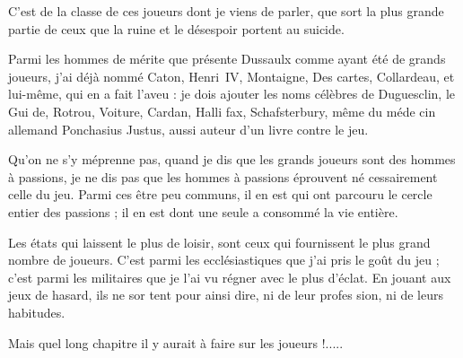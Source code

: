C'est de la classe de ces joueurs dont
je viens de parler, que sort la plus
grande partie de ceux que la ruine et
le désespoir portent au suicide.

Parmi les hommes de mérite que
présente Dussaulx comme ayant été
de grands joueurs, j'ai déjà nommé
Caton, Henri~IV, Montaigne, Des%
cartes, Collardeau, et lui-même, qui
en a fait l'aveu : je dois ajouter les
noms célèbres de Duguesclin, le Gui%
de, Rotrou, Voiture, Cardan, Halli%
fax, Schafsterbury, même du méde%
cin allemand Ponchasius Justus, aussi
auteur d'un livre contre le jeu.

Qu'on ne s'y méprenne pas, quand
je dis que les grands joueurs sont des
hommes à passions, je ne dis pas que
les hommes à passions éprouvent né%
cessairement celle du jeu. Parmi ces
être peu communs, il en est qui ont
parcouru le cercle entier des passions ;
il en est dont une seule a consommé
la vie entière.

Les états qui laissent le plus de loisir,
sont ceux qui fournissent le plus grand
nombre de joueurs. C'est parmi les
ecclésiastiques que j'ai pris le goût du
jeu ; c'est parmi les militaires que je
l'ai vu régner avec le plus d'éclat. En
jouant aux jeux de hasard, ils ne sor%
tent pour ainsi dire, ni de leur profes%
sion, ni de leurs habitudes.

Mais quel long chapitre il y aurait
à faire sur les joueurs !.....


